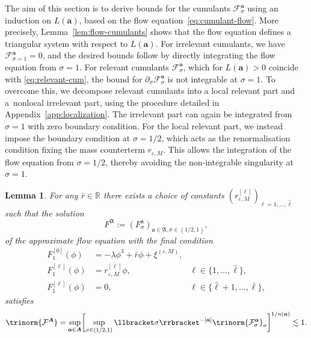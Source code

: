 \documentclass{article}
\numberwithin{equation}{section}
\newcommand{\assign}{:=}
\theoremstyle{plain}
\newtheorem{lemma}[theorem]{Lemma}
\theoremstyle{definition}
\begin{document}
The aim of this section is to derive bounds for the cumulants
$\mathcal{F}^{\boldsymbol{a}}_{\sigma}$ using an induction on $L
(\boldsymbol{a})$, based on the flow equation~\eqref{eq:cumulant-flow}. More
precisely, Lemma~\ref{lem:flow-cumulants} shows that the flow equation defines
a triangular system with respect to $L (\boldsymbol{a})$. For irrelevant
cumulants, we have $\mathcal{F}^{\boldsymbol{a}}_{\sigma = 1} = 0$, and the
desired bounds follow by directly integrating the flow equation from $\sigma =
1$. For relevant cumulants $\mathcal{F}^{\boldsymbol{a}}_{\sigma}$, which for $L
(\boldsymbol{a}) > 0$ coincide with \eqref{eq:relevant-cum}, the bound for
$\partial_{\sigma} \mathcal{F}^{\boldsymbol{a}}_{\sigma}$ is not integrable at
$\sigma = 1$. To overcome this, we decompose relevant cumulants into a local
relevant part and a~nonlocal irrelevant part, using the procedure detailed in
Appendix~\ref{app:localization}. The irrelevant part can again be integrated
from $\sigma = 1$ with zero boundary condition. For the local relevant part, we
instead impose the boundary condition at $\sigma = 1 / 2$, which acts as the
renormalisation condition fixing the mass counterterm $r_{\varepsilon, M}$.
This allows the integration of the flow equation from $\sigma = 1 / 2$,
thereby avoiding the non-integrable singularity at $\sigma = 1$.

\begin{lemma}
  \label{lem:cumul-est-1}For any $\bar{r} \in \mathbb{R}$ there exists
  a choice of constants $(r^{[\ell]}_{\varepsilon, M})_{\ell = 1,
  \ldots, \hat{\ell}}$ such that the solution
  \[ F^{\mathfrak{A}} \assign (F^{\mathfrak{a}}_{\sigma})_{\mathfrak{a} \in
     \mathfrak{A}, \sigma \in (1 / 2, 1)}, \]
  of the approximate flow equation with the final condition
  \begin{equation}
    \begin{aligned}
      F^{[0]}_1 (\phi) & = - \lambda \phi^3 + \bar{r} \phi +
      \xi^{(\varepsilon, M)},& \\
      F^{[\ell]}_1 (\phi) & = r^{[\ell]}_{\varepsilon, M} \phi, &\ell \in \{
      1, \ldots, \hat{\ell} \},\\
      F^{[\ell]}_1 (\phi) & = 0, &\ell \in \{ \hat{\ell} + 1, \ldots,
      \bar{\ell} \},
    \end{aligned} \label{eq:initial-cond-induction-lemma}
  \end{equation}
  satisfies
  \[ \trinorm{ \mathcal{F}^{\boldsymbol{A}} } = \sup_{\boldsymbol{a}
     \in \boldsymbol{A}} \biggl[\sup_{\sigma \in (1 / 2, 1)} \llbracket \sigma
     \rrbracket^{- [\boldsymbol{a}]}  \trinorm{
     \mathcal{F}^{\boldsymbol{a}}_{\sigma} }_{\sigma}\biggr]^{1 / n
     (\boldsymbol{a})} \lesssim 1. \]
\end{lemma}
\end{document}
